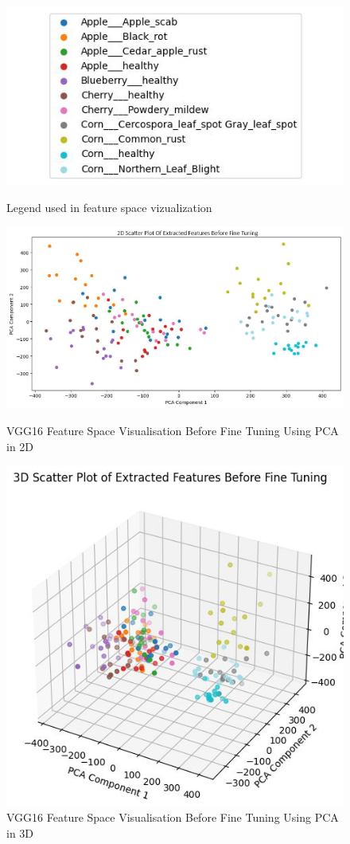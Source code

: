 \begin{figure}
    \centering
    \includegraphics[width=0.5\linewidth]{graphics//chapter7/pca legend.png}
    \caption{Legend used in feature space vizualization}
    \label{fig:pca-legend}
    \includegraphics[width=1\linewidth]{graphics//chapter7/pca viz bft 2d.png}
    \caption{VGG16 Feature Space Visualisation Before Fine Tuning Using PCA in 2D}
    \label{fig:pca-bft-2d}
    \includegraphics[width=0.65\linewidth]{graphics//chapter7/pca viz bft 3d.png}
    \caption{VGG16 Feature Space Visualisation Before Fine Tuning Using PCA in 3D}
    \label{fig:pca-bft-3d}
\end{figure}

